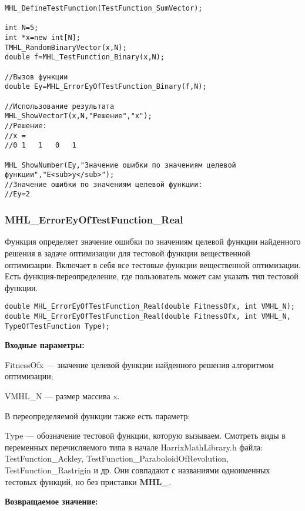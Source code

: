 \documentclass[a4paper,12pt]{article}
\begin{document}
\begin{lstlisting}[label=code_use_MHL_ErrorEyOfTestFunction_Binary,caption=Пример использования]
MHL_DefineTestFunction(TestFunction_SumVector);

int N=5;
int *x=new int[N];
TMHL_RandomBinaryVector(x,N);
double f=MHL_TestFunction_Binary(x,N);

//Вызов функции
double Ey=MHL_ErrorEyOfTestFunction_Binary(f,N);

//Использование результата
MHL_ShowVectorT(x,N,"Решение","x");
//Решение:
//x =	
//0	1	1	0	1

MHL_ShowNumber(Ey,"Значение ошибки по значениям целевой функции","E<sub>y</sub>");
//Значение ошибки по значениям целевой функции:
//Ey=2
\end{lstlisting}

\subsubsection{MHL\_ErrorEyOfTestFunction\_Real}\label{MHL_ErrorEyOfTestFunction_Real}

Функция определяет значение ошибки по значениям целевой функции найденного решения в задаче оптимизации для тестовой функции вещественной оптимизации. Включает в себя все тестовые функции вещественной оптимизации. Есть функция-переопределение, где пользователь может сам указать тип тестовой функции.


\begin{lstlisting}[label=code_syntax_MHL_ErrorEyOfTestFunction_Real,caption=Синтаксис]
double MHL_ErrorEyOfTestFunction_Real(double FitnessOfx, int VMHL_N);
double MHL_ErrorEyOfTestFunction_Real(double FitnessOfx, int VMHL_N, TypeOfTestFunction Type);
\end{lstlisting}

\textbf{Входные параметры:}

FitnessOfx --- значение целевой функции найденного решения алгоритмом оптимизации;

VMHL\_N --- размер массива x.

В переопределяемой функции также есть параметр:
  
Type --- обозначение тестовой функции, которую вызываем.
Смотреть виды в переменных перечисляемого типа в начале HarrixMathLibrary.h файла: TestFunction\_Ackley, TestFunction\_ParaboloidOfRevolution, TestFunction\_Rastrigin и др. Они совпадают с названиями одноименных тестовых функций, но без приставки \textbf{MHL\_}.

\textbf{Возвращаемое значение:}
 
\end{document}
